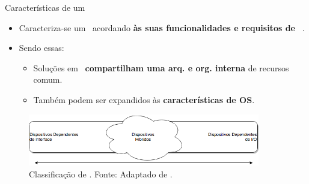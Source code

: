       
         \begin{frame}{Características de um \Wearable} \vspace{-1em}
            \begin{itemize} \setlength{\itemsep}{1.5em}
               \item Caracteriza-se um \wearable\ acordando \textbf{às suas funcionalidades e requisitos de \hardware}\ \cite{Delabrida2016, Amorim2017}.
               
               \item Sendo essas:
                
               \begin{itemize}
                  \setlength{\itemsep}{0.5em}
                  \item Soluções em \hardware\ \textbf{compartilham uma arq. e org. interna} de recursos comum.
                  
                  \item Também podem ser expandidos às \textbf{características de OS}.
                  
               \end{itemize}
            \end{itemize}
      
            \begin{figure}[h] \centering
               \vspace{-5pt}
               \includegraphics[width=0.9\textwidth]{img/rt-gradiente.png}
               \caption{Classificação de \wearables. Fonte: Adaptado de \cite{Amorim2017}.}
            \end{figure}
         \end{frame}
      
